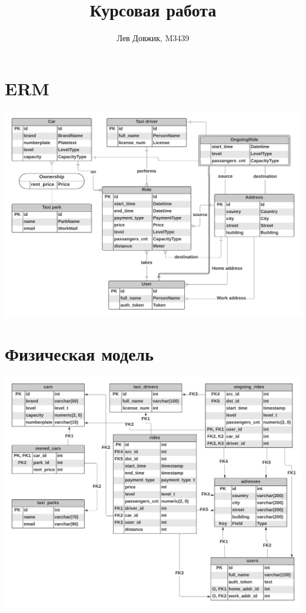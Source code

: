 \documentclass[fontsize=12pt]{article}
\title{Курсовая работа}
\author{Лев Довжик, M3439}
\date{}
\begin{document}
	\maketitle
	
\section{ERM}

\includegraphics[scale=0.72]{Taxi.png}

\section{Физическая модель}

\includegraphics[scale=0.7]{Taxi_phys.png}
\end{document}
